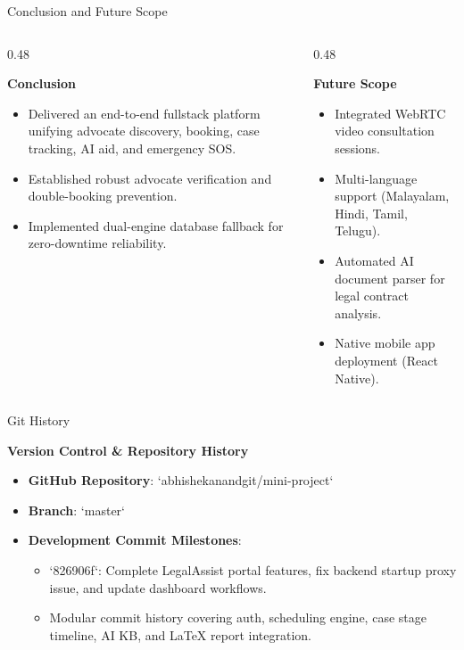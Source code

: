 \documentclass[10pt,aspectratio=169]{beamer}
\begin{document}
\begin{frame}{Conclusion and Future Scope}
  \begin{columns}[T]
    \begin{column}{0.48\textwidth}
      \begin{block}{\textbf{Conclusion}}
        \begin{itemize}
          \item Delivered an end-to-end fullstack platform unifying advocate discovery, booking, case tracking, AI aid, and emergency SOS.
          \item Established robust advocate verification and double-booking prevention.
          \item Implemented dual-engine database fallback for zero-downtime reliability.
        \end{itemize}
      \end{block}
    \end{column}

    \begin{column}{0.48\textwidth}
      \begin{block}{\textbf{Future Scope}}
        \begin{itemize}
          \item Integrated WebRTC video consultation sessions.
          \item Multi-language support (Malayalam, Hindi, Tamil, Telugu).
          \item Automated AI document parser for legal contract analysis.
          \item Native mobile app deployment (React Native).
        \end{itemize}
      \end{block}
    \end{column}
  \end{columns}
\end{frame}

\begin{frame}{Git History}
  \begin{block}{\textbf{Version Control \& Repository History}}
    \begin{itemize}
      \item \textbf{GitHub Repository}: `abhishekanandgit/mini-project`
      \item \textbf{Branch}: `master`
      \item \textbf{Development Commit Milestones}:
        \begin{itemize}
          \item `826906f`: Complete LegalAssist portal features, fix backend startup proxy issue, and update dashboard workflows.
          \item Modular commit history covering auth, scheduling engine, case stage timeline, AI KB, and LaTeX report integration.
        \end{itemize}
    \end{itemize}
  \end{block}
\end{frame}
\end{document}
